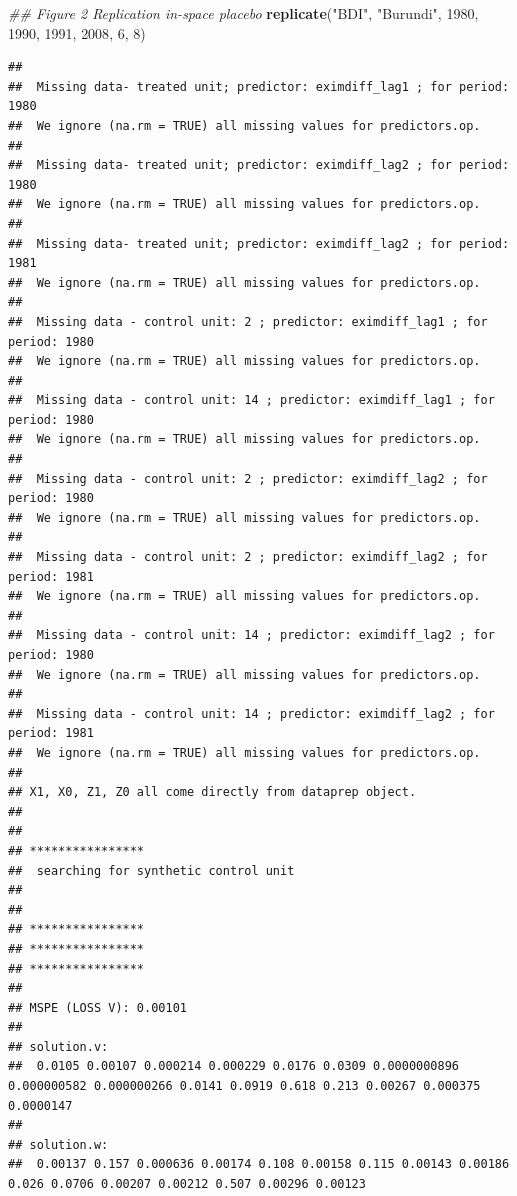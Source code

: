 \documentclass[]{article}
\newenvironment{Shaded}{\begin{snugshade}}{\end{snugshade}}
\newcommand{\CommentTok}[1]{\textcolor[rgb]{0.56,0.35,0.01}{\textit{#1}}}
\newcommand{\DecValTok}[1]{\textcolor[rgb]{0.00,0.00,0.81}{#1}}
\newcommand{\KeywordTok}[1]{\textcolor[rgb]{0.13,0.29,0.53}{\textbf{#1}}}
\newcommand{\NormalTok}[1]{#1}
\newcommand{\StringTok}[1]{\textcolor[rgb]{0.31,0.60,0.02}{#1}}
\begin{document}
\begin{Shaded}
\begin{Highlighting}[]
\CommentTok{## Figure 2 Replication in-space placebo}
\KeywordTok{replicate}\NormalTok{(}\StringTok{"BDI"}\NormalTok{, }\StringTok{"Burundi"}\NormalTok{, }\DecValTok{1980}\NormalTok{, }\DecValTok{1990}\NormalTok{, }\DecValTok{1991}\NormalTok{, }\DecValTok{2008}\NormalTok{, }\DecValTok{6}\NormalTok{, }\DecValTok{8}\NormalTok{)  }
\end{Highlighting}
\end{Shaded}

\begin{verbatim}
## 
##  Missing data- treated unit; predictor: eximdiff_lag1 ; for period: 1980 
##  We ignore (na.rm = TRUE) all missing values for predictors.op.
## 
##  Missing data- treated unit; predictor: eximdiff_lag2 ; for period: 1980 
##  We ignore (na.rm = TRUE) all missing values for predictors.op.
## 
##  Missing data- treated unit; predictor: eximdiff_lag2 ; for period: 1981 
##  We ignore (na.rm = TRUE) all missing values for predictors.op.
## 
##  Missing data - control unit: 2 ; predictor: eximdiff_lag1 ; for period: 1980 
##  We ignore (na.rm = TRUE) all missing values for predictors.op.
## 
##  Missing data - control unit: 14 ; predictor: eximdiff_lag1 ; for period: 1980 
##  We ignore (na.rm = TRUE) all missing values for predictors.op.
## 
##  Missing data - control unit: 2 ; predictor: eximdiff_lag2 ; for period: 1980 
##  We ignore (na.rm = TRUE) all missing values for predictors.op.
## 
##  Missing data - control unit: 2 ; predictor: eximdiff_lag2 ; for period: 1981 
##  We ignore (na.rm = TRUE) all missing values for predictors.op.
## 
##  Missing data - control unit: 14 ; predictor: eximdiff_lag2 ; for period: 1980 
##  We ignore (na.rm = TRUE) all missing values for predictors.op.
## 
##  Missing data - control unit: 14 ; predictor: eximdiff_lag2 ; for period: 1981 
##  We ignore (na.rm = TRUE) all missing values for predictors.op.
## 
## X1, X0, Z1, Z0 all come directly from dataprep object.
## 
## 
## **************** 
##  searching for synthetic control unit  
##  
## 
## **************** 
## **************** 
## **************** 
## 
## MSPE (LOSS V): 0.00101 
## 
## solution.v:
##  0.0105 0.00107 0.000214 0.000229 0.0176 0.0309 0.0000000896 0.000000582 0.000000266 0.0141 0.0919 0.618 0.213 0.00267 0.000375 0.0000147 
## 
## solution.w:
##  0.00137 0.157 0.000636 0.00174 0.108 0.00158 0.115 0.00143 0.00186 0.026 0.0706 0.00207 0.00212 0.507 0.00296 0.00123
\end{verbatim}
\end{document}
